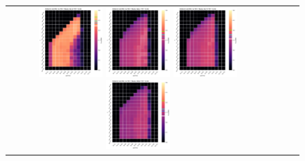 \begin{figure}[h!]
\begin{tabular}{cccc}
  \includegraphics[width=0.25\textwidth]{Kap8/heatmap_train=b234_test=b261.png}  
  \includegraphics[width=0.25\textwidth]{Kap8/heatmap_train=b261_test=b234.png}
  \includegraphics[width=0.25\textwidth]{Kap8/heatmap_train=b278_test=b234.png} 
   \includegraphics[width=0.25\textwidth]{Kap8/heatmap_train=b360_test=b234.png} \\


\end{tabular}
\end{figure}
